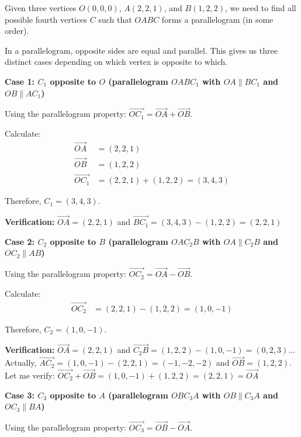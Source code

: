 \begin{solution}[Sketch]
Given three vertices $O(0,0,0)$, $A(2,2,1)$, and $B(1,2,2)$, we need to find all possible fourth vertices $C$ such that $OABC$ forms a parallelogram (in some order).

In a parallelogram, opposite sides are equal and parallel. This gives us three distinct cases depending on which vertex is opposite to which.

\textbf{Case 1: $C_1$ opposite to $O$ (parallelogram $OABC_1$ with $OA \parallel BC_1$ and $OB \parallel AC_1$)}

Using the parallelogram property: $\overrightarrow{OC_1} = \overrightarrow{OA} + \overrightarrow{OB}$.

Calculate:
\begin{align*}
\overrightarrow{OA} &= (2, 2, 1) \\
\overrightarrow{OB} &= (1, 2, 2) \\
\overrightarrow{OC_1} &= (2, 2, 1) + (1, 2, 2) = (3, 4, 3)
\end{align*}

Therefore, $C_1 = (3, 4, 3)$.

\textbf{Verification:} $\overrightarrow{OA} = (2,2,1)$ and $\overrightarrow{BC_1} = (3,4,3) - (1,2,2) = (2,2,1)$ \checkmark

\textbf{Case 2: $C_2$ opposite to $B$ (parallelogram $OAC_2B$ with $OA \parallel C_2B$ and $OC_2 \parallel AB$)}

Using the parallelogram property: $\overrightarrow{OC_2} = \overrightarrow{OA} - \overrightarrow{OB}$.

Calculate:
\begin{align*}
\overrightarrow{OC_2} &= (2, 2, 1) - (1, 2, 2) = (1, 0, -1)
\end{align*}

Therefore, $C_2 = (1, 0, -1)$.

\textbf{Verification:} $\overrightarrow{OA} = (2,2,1)$ and $\overrightarrow{C_2B} = (1,2,2) - (1,0,-1) = (0,2,3)$... Actually, $\overrightarrow{AC_2} = (1,0,-1) - (2,2,1) = (-1,-2,-2)$ and $\overrightarrow{OB} = (1,2,2)$. Let me verify: $\overrightarrow{OC_2} + \overrightarrow{OB} = (1,0,-1) + (1,2,2) = (2,2,1) = \overrightarrow{OA}$ \checkmark

\textbf{Case 3: $C_3$ opposite to $A$ (parallelogram $OBC_3A$ with $OB \parallel C_3A$ and $OC_3 \parallel BA$)}

Using the parallelogram property: $\overrightarrow{OC_3} = \overrightarrow{OB} - \overrightarrow{OA}$.


\end{solution}
